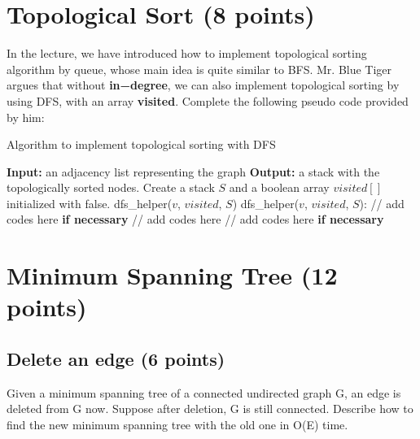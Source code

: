 \documentclass[11pt]{exam}
\begin{document}
\section{Topological Sort (8 points)}
    In the lecture, we have introduced how to implement topological sorting algorithm by queue, whose main idea is quite similar to BFS. Mr. Blue Tiger argues that without \textbf{in−degree}, we can also implement topological sorting by using DFS, with an array \textbf{visited}. Complete the following pseudo code provided by him:
    \newline
    \newline
    \begin{algorithm}[htbp]
            \caption{Algorithm to implement topological sorting with DFS}
            \begin{algorithmic}[1]
                \STATE \textbf{Input:} an adjacency list representing the graph
                \STATE \textbf{Output:} a stack with the topologically sorted nodes.
                \STATE Create a stack $S$ and a boolean array $visited[]$ initialized with false.
                    \STATE dfs\_helper($v$, $visited$, $S$)
                \ENDFOR
                \newline
                \STATE dfs\_helper($v$, $visited$, $S$):
                \STATE // add codes here \textbf{if necessary}
                \newline
                \STATE // add codes here
                \newline
                \ENDFOR
                \STATE // add codes here \textbf{if necessary}
            \end{algorithmic}
        \end{algorithm}

\section{Minimum Spanning Tree (12 points)}
\subsection{Delete an edge (6 points)}
Given a minimum spanning tree of a connected undirected graph G, an edge is deleted from G now. Suppose after deletion, G is still connected. Describe how to find the new minimum spanning tree with the old one in O(E) time.
\begin{solution}
\end{solution}
\end{document}
